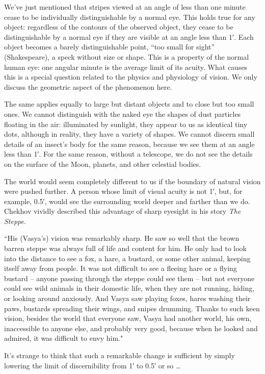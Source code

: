 We've just mentioned that stripes viewed at an angle of less than one minute cease to be individually distinguishable by a normal eye. This holds true for any object: regardless of the contours of the observed object, they cease to be distinguishable by a normal eye if they are visible at an angle less than \ang{;1}. Each object becomes a barely distinguishable point, ``too small for sight'' (Shakespeare), a speck without size or shape. This is a property of the normal human eye: one angular minute is the average limit of its acuity. What causes this is a special question related to the physics and physiology of vision. We only discuss the geometric aspect of the phenomenon here.

The same applies equally to large but distant objects and to close but too small ones. We cannot distinguish with the naked eye the shapes of dust particles floating in the air: illuminated by sunlight, they appear to us as identical tiny dots, although in reality, they have a variety of shapes. We cannot discern small details of an insect's body for the same reason, because we see them at an angle less than \ang{;1}. For the same reason, without a telescope, we do not see the details on the surface of the Moon, planets, and other celestial bodies.

The world would seem completely different to us if the boundary of natural vision were pushed further. A person whose limit of visual acuity is not \ang{;1}, but, for example, \ang{;0.5}, would see the surrounding world deeper and farther than we do. Chekhov vividly described this advantage of sharp eyesight in his story \emph{The Steppe}.

``His (Vasya's) vision was remarkably sharp. He saw so well that the brown barren steppe was always full of life and content for him. He only had to look into the distance to see a fox, a hare, a bustard, or some other animal, keeping itself away from people. It was not difficult to see a fleeing hare or a flying bustard -- anyone passing through the steppe could see them -- but not everyone could see wild animals in their domestic life, when they are not running, hiding, or looking around anxiously. And Vasya saw playing foxes, hares washing their paws, bustards spreading their wings, and snipes drumming. Thanks to such keen vision, besides the world that everyone saw, Vasya had another world, his own, inaccessible to anyone else, and probably very good, because when he looked and admired, it was difficult to envy him."

It's strange to think that such a remarkable change is sufficient by simply lowering the limit of discernibility from \ang{;1} to \ang{;0.5} or so \dots{}

